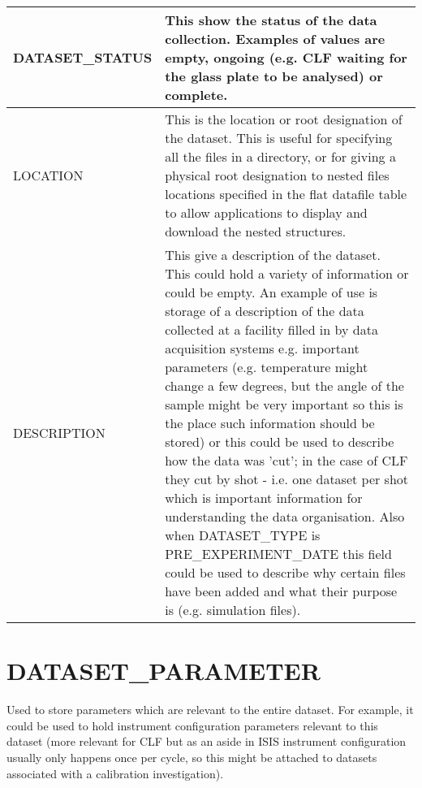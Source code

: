 \documentclass{report}
\begin{document}
\begin{tabular}{|l|l|}
DATASET\_STATUS & \multicolumn{1}{p{100mm}|}{
This show the status of the data collection. Examples of values are empty, ongoing (e.g. CLF waiting for the glass plate to be analysed) or complete.} \\ \hline
LOCATION & \multicolumn{1}{p{100mm}|}{
This is the location or root designation of the dataset. This is useful for specifying all the files in a directory, or for giving a physical root designation to nested files locations specified in the flat datafile table to allow applications to display and download the nested structures.} \\ \hline
DESCRIPTION & \multicolumn{1}{p{100mm}|}{
This give a description of the dataset. This could hold a variety of information or could be empty. An example of use is storage of a description of the data collected at a facility filled in by data acquisition systems e.g. important parameters (e.g. temperature might change a few degrees, but the angle of the sample might be very important so this is the place such information should be stored) or this could be used to describe how the data was 'cut'; in the case of CLF they cut by shot - i.e. one dataset per shot which is important information for understanding the data organisation. Also when DATASET\_TYPE is PRE\_EXPERIMENT\_DATE this field could be used to describe why certain files have been added and what their purpose is (e.g. simulation files).} \\ \hline
\end{tabular}
\section{DATASET\_PARAMETER}

Used to store parameters which are relevant to the entire dataset. For example, it could be used to hold instrument configuration parameters relevant to this dataset (more relevant for CLF but as an	aside in ISIS instrument configuration usually only happens once per cycle, so this might be attached to datasets associated with a calibration investigation).\\
\end{document}
